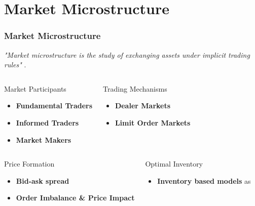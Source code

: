\documentclass[aspectratio=1610]{beamer}
\begin{document}

\section{Market Microstructure}

\begin{frame}
  \frametitle{\hfill Market Microstructure}
  \textit{"Market microstructure is the study of exchanging assets under implicit trading rules"} \parencite{madhavan2000market, o1995market}.
  
  \begin{columns}[t]
    \begin{block}{Market Participants}
        \begin{itemize}
        \item \textbf{Fundamental Traders}
        \item \textbf{Informed Traders}
        \item \textbf{Market Makers}
        \end{itemize}
    \end{block}
    \begin{block}{Trading Mechanisms}
        \begin{itemize}
        \item \textbf{Dealer Markets}
        \item \textbf{Limit Order Markets}
        \end{itemize}
    \end{block}
\end{columns}

\begin{columns}[t]
    \begin{block}{Price Formation}
        \begin{itemize}
        \item \textbf{Bid-ask spread}
        \item \textbf{Order Imbalance \& Price Impact}
        
        \end{itemize}
    \end{block}
    \begin{block}{Optimal Inventory}
        \begin{itemize}
        \item \textbf{Inventory based models} as \textcite{ho1981optimal}
        \end{itemize}
    \end{block}
\end{columns}
  
\end{frame}
\end{document}
